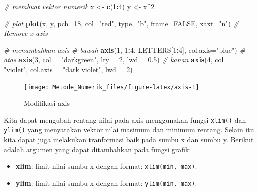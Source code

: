 \documentclass[]{book}
\newenvironment{Shaded}{\begin{snugshade}}{\end{snugshade}}
\newcommand{\CommentTok}[1]{\textcolor[rgb]{0.56,0.35,0.01}{\textit{#1}}}
\newcommand{\DataTypeTok}[1]{\textcolor[rgb]{0.13,0.29,0.53}{#1}}
\newcommand{\DecValTok}[1]{\textcolor[rgb]{0.00,0.00,0.81}{#1}}
\newcommand{\FloatTok}[1]{\textcolor[rgb]{0.00,0.00,0.81}{#1}}
\newcommand{\KeywordTok}[1]{\textcolor[rgb]{0.13,0.29,0.53}{\textbf{#1}}}
\newcommand{\NormalTok}[1]{#1}
\newcommand{\OperatorTok}[1]{\textcolor[rgb]{0.81,0.36,0.00}{\textbf{#1}}}
\newcommand{\OtherTok}[1]{\textcolor[rgb]{0.56,0.35,0.01}{#1}}
\newcommand{\StringTok}[1]{\textcolor[rgb]{0.31,0.60,0.02}{#1}}
\providecommand{\tightlist}{%
  \setlength{\itemsep}{0pt}\setlength{\parskip}{0pt}}
\theoremstyle{definition}
\theoremstyle{definition}
\theoremstyle{definition}
\theoremstyle{remark}
\begin{document}
\begin{Shaded}
\begin{Highlighting}[]
\CommentTok{# membuat vektor numerik}
\NormalTok{x <-}\StringTok{ }\KeywordTok{c}\NormalTok{(}\DecValTok{1}\OperatorTok{:}\DecValTok{4}\NormalTok{)}
\NormalTok{y <-}\StringTok{ }\NormalTok{x}\OperatorTok{^}\DecValTok{2}

\CommentTok{# plot}
\KeywordTok{plot}\NormalTok{(x, y, }\DataTypeTok{pch=}\DecValTok{18}\NormalTok{, }\DataTypeTok{col=}\StringTok{"red"}\NormalTok{, }\DataTypeTok{type=}\StringTok{"b"}\NormalTok{,}
     \DataTypeTok{frame=}\OtherTok{FALSE}\NormalTok{, }\DataTypeTok{xaxt=}\StringTok{"n"}\NormalTok{) }\CommentTok{# Remove x axis}

\CommentTok{# menambahkan axis}
\CommentTok{# bawah}
\KeywordTok{axis}\NormalTok{(}\DecValTok{1}\NormalTok{, }\DecValTok{1}\OperatorTok{:}\DecValTok{4}\NormalTok{, LETTERS[}\DecValTok{1}\OperatorTok{:}\DecValTok{4}\NormalTok{], }\DataTypeTok{col.axis=}\StringTok{"blue"}\NormalTok{)}
\CommentTok{# atas}
\KeywordTok{axis}\NormalTok{(}\DecValTok{3}\NormalTok{, }\DataTypeTok{col =} \StringTok{"darkgreen"}\NormalTok{, }\DataTypeTok{lty =} \DecValTok{2}\NormalTok{, }\DataTypeTok{lwd =} \FloatTok{0.5}\NormalTok{)}
\CommentTok{# kanan}
\KeywordTok{axis}\NormalTok{(}\DecValTok{4}\NormalTok{, }\DataTypeTok{col =} \StringTok{"violet"}\NormalTok{, }\DataTypeTok{col.axis =} \StringTok{"dark violet"}\NormalTok{, }\DataTypeTok{lwd =} \DecValTok{2}\NormalTok{)}
\end{Highlighting}
\end{Shaded}

\begin{figure}

{\centering \texttt{[image: Metode\_Numerik\_files/figure-latex/axis-1]} 

}

\caption{Modifikasi axis}\label{fig:axis}
\end{figure}

Kita dapat mengubah rentang nilai pada axis menggunakan fungsi \texttt{xlim()} dan \texttt{ylim()} yang menyatakan vektor nilai masimum dan minimum rentang. Selain itu kita dapat juga melakukan tranformasi baik pada sumbu x dan sumbu y. Berikut adalah argumen yang dapat ditambahkan pada fungsi grafik:

\begin{itemize}
\tightlist
\item
  \textbf{xlim}: limit nilai sumbu x dengan format: \texttt{xlim(min,\ max)}.
\item
  \textbf{ylim}: limit nilai sumbu x dengan format: \texttt{ylim(min,\ max)}.
\end{itemize}
\end{document}
